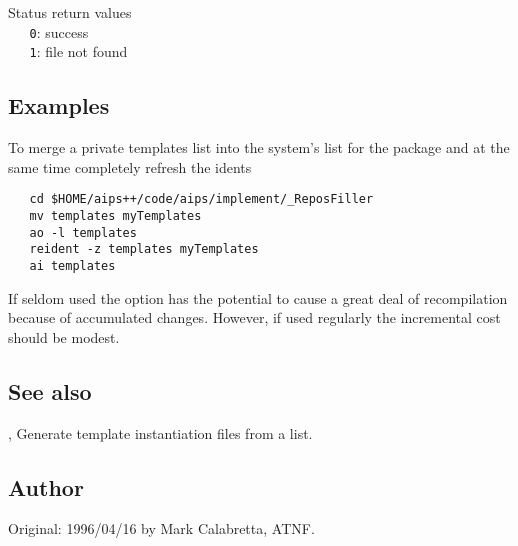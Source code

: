 Status return values
\\ \verb+   0+: success
\\ \verb+   1+: file not found

\subsection*{Examples}

To merge a private templates list into the system's list for the 
package and at the same time completely refresh the idents

\begin{verbatim}
   cd $HOME/aips++/code/aips/implement/_ReposFiller
   mv templates myTemplates
   ao -l templates
   reident -z templates myTemplates
   ai templates
\end{verbatim}

\noindent
If seldom used the  option has the potential to cause a great deal of
recompilation because of accumulated changes.  However, if used regularly the
incremental cost should be modest.

\subsection*{See also}

, Generate template instantiation files from a list.

\subsection*{Author}

Original: 1996/04/16 by Mark Calabretta, ATNF.
